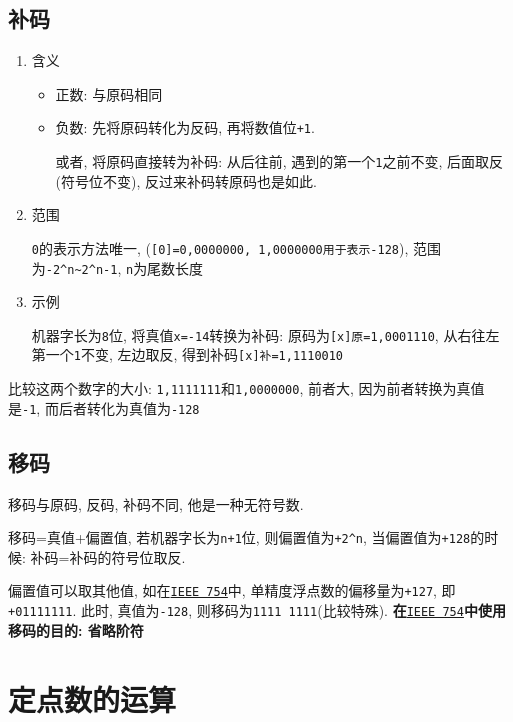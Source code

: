 \subsection{补码}
\begin{enumerate}
\item 含义 \par
\begin{itemize}
\item 正数: 与原码相同
\item 负数: 先将原码转化为反码, 再将数值位\verb|+1|. \par 或者, 将原码直接转为补码: 从后往前, 遇到的第一个\verb|1|之前不变, 后面取反(符号位不变), 反过来补码转原码也是如此.
\end{itemize}
\item 范围 \par
\verb|0|的表示方法唯一, (\verb|[0]=0,0000000, 1,0000000用于表示-128|), 范围为\verb|-2^n~2^n-1|, \verb|n|为尾数长度
\item 示例 \par
机器字长为\verb|8|位, 将真值\verb|x=-14|转换为补码: 原码为\verb|[x]原=1,0001110|, 从右往左第一个\verb|1|不变, 左边取反, 得到补码\verb|[x]补=1,1110010|
\end{enumerate} \par 比较这两个数字的大小: \verb|1,1111111|和\verb|1,0000000|, 前者大, 因为前者转换为真值是\verb|-1|, 而后者转化为真值为\verb|-128|
\subsection{移码}\label{移码}
移码与原码, 反码, 补码不同, 他是一种无符号数. \par 移码=真值+偏置值, 若机器字长为\verb|n+1|位, 则偏置值为\verb|+2^n|, 当偏置值为\verb|+128|的时候: 补码=补码的符号位取反. \par
偏置值可以取其他值, 如在\hyperref[IEEE 754]{\texttt{IEEE 754}}中, 单精度浮点数的偏移量为\verb|+127|, 即\verb|+01111111|. 此时, 真值为\verb|-128|, 则移码为\verb|1111 1111|(比较特殊).
\textbf{在}\hyperref[IEEE 754]{\texttt{IEEE 754}}\textbf{中使用移码的目的: 省略阶符}\par
\section{定点数的运算}
